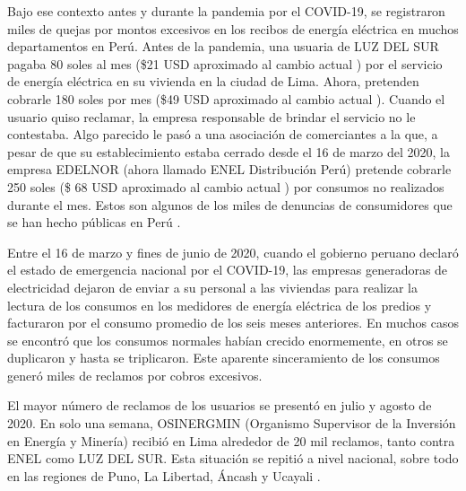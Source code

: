 Bajo ese contexto antes y durante la pandemia por el COVID-19, se registraron miles de quejas por montos excesivos en los recibos de energía eléctrica en muchos departamentos en Perú. Antes de la pandemia, una usuaria de LUZ DEL SUR \citep{WEBSITE:32} pagaba 80 soles al mes (\$21 USD aproximado al cambio actual \citep{WEBSITE:43}) por el servicio de energía eléctrica en su vivienda en la ciudad de Lima. Ahora, pretenden cobrarle 180 soles por mes (\$49 USD aproximado al cambio actual \citep{WEBSITE:43}). Cuando el usuario quiso reclamar, la empresa responsable de brindar el servicio no le contestaba. Algo parecido le pasó a una asociación de comerciantes a la que, a pesar de que su establecimiento estaba cerrado desde el 16 de marzo del 2020, la empresa EDELNOR (ahora llamado ENEL Distribución Perú) \citep{WEBSITE:33} \citep{WEBSITE:34} pretende cobrarle 250 soles (\$ 68 USD aproximado al cambio actual \citep{WEBSITE:43}) por consumos no realizados durante el mes. Estos son algunos de los miles de denuncias de consumidores que se han hecho públicas en Perú  \citep{WEBSITE:1}.

Entre el 16 de marzo y fines de junio de 2020, cuando el gobierno peruano declaró el estado de emergencia nacional por el COVID-19, las empresas generadoras de electricidad dejaron de enviar a su personal a las viviendas para realizar la lectura de los consumos en los medidores de energía eléctrica de los predios y facturaron por el consumo promedio de los seis meses anteriores. En muchos casos se encontró que los consumos normales habían crecido enormemente, en otros se duplicaron y hasta se triplicaron. Este aparente sinceramiento de los consumos generó miles de reclamos por cobros excesivos. %

El mayor número de reclamos de los usuarios se presentó en julio y agosto de 2020. En solo una semana, OSINERGMIN (Organismo Supervisor de la Inversión en Energía y Minería) recibió en Lima alrededor de 20 mil reclamos, tanto contra ENEL como LUZ DEL SUR. Esta situación se repitió a nivel nacional, sobre todo en las regiones de Puno, La Libertad, Áncash y Ucayali \citep{WEBSITE:1}.


